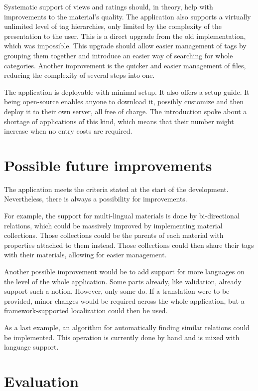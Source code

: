 \documentclass[
  digital,     %
  oneside,     %
  nosansbold,  %
  colorbold, %
  lof,         %
  lot,         %
]{fithesis4}
\begin{document}
Systematic support of views and ratings should, in theory, help with improvements to the material's quality. The application also supports a virtually unlimited level of tag hierarchies, only limited by the complexity of the presentation to the user. This is a direct upgrade from the old implementation, which was impossible. This upgrade should allow easier management of tags by grouping them together and introduce an easier way of searching for whole categories. Another improvement is the quicker and easier management of files, reducing the complexity of several steps into one.

The application is deployable with minimal setup. It also offers a setup guide. It being open-source enables anyone to download it, possibly customize and then deploy it to their own server, all free of charge. The introduction spoke about a shortage of applications of this kind, which means that their number might increase when no entry costs are required.

\section{Possible future improvements}

The application meets the criteria stated at the start of the development. Nevertheless, there is always a possibility for improvements.

For example, the support for multi-lingual materials is done by bi-directional relations, which could be massively improved by implementing material collections. Those collections could be the parents of each material with properties attached to them instead. Those collections could then share their tags with their materials, allowing for easier management.

Another possible improvement would be to add support for more languages on the level of the whole application. Some parts already, like validation, already support such a notion. However, only some do. If a translation were to be provided, minor changes would be required across the whole application, but a framework-supported localization could then be used.

As a last example, an algorithm for automatically finding similar relations could be implemented. This operation is currently done by hand and is mixed with language support.

\section{Evaluation}
\end{document}
